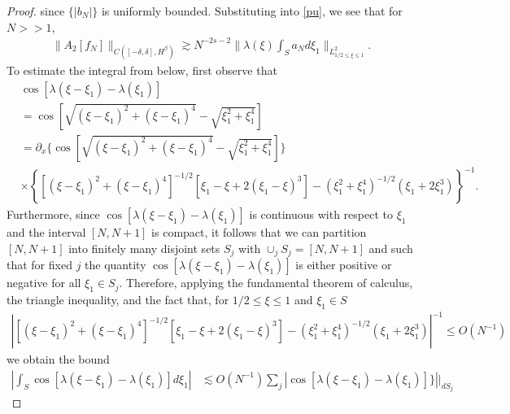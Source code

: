 \documentclass[12pt,reqno]{amsart}
\numberwithin{equation}{section}  %
\newcommand{\p}{\partial}
\begin{document}
\begin{proof}
%
since $\{|b_{N}|\}$ is uniformly bounded. Substituting into \eqref{pu}, we see that for $N > > 1$,  
%
%
\begin{equation*}
\begin{split}
\|A_{2}[f_{N}]\|_{C( [-\delta, \delta], H^{\beta})}
\gtrsim N^{-2 s -2} \|  \lambda(\xi) \int_{S}a_{N} d \xi_{1} \|_{L^{2}_{1/2 \le \xi \le 1}}.
\end{split}
\end{equation*}
%
%
To estimate the integral from below, first observe that 
\begin{equation*}
\begin{split}
  & \cos[\lambda(\xi - \xi_{1}) - \lambda(\xi_{1})] 
  \\
  & = \cos\left[ \sqrt{(\xi - \xi_{1})^{2} + (\xi - \xi_{1})^{4}} - \sqrt{\xi_{1}^{2} + \xi_{1}^{4}} \right] 
  \\
  & = \p_{x} \{ \cos\left[ \sqrt{(\xi - \xi_{1})^{2} + (\xi - \xi_{1})^{4}} - \sqrt{\xi_{1}^{2} + \xi_{1}^{4}} \right] \} 
  \\
  & \times \left\{ [(\xi - \xi_{1})^{2} + (\xi - \xi_{1})^{4}]^{-1/2}[\xi_{1} - \xi + 2(\xi_{1} - \xi)^{3}] - (\xi_{1}^{2} + \xi_{1}^{4})^{-1/2} (\xi_{1} + 2 \xi_{1}^{3}) \right\}^{-1}.
\end{split}
\end{equation*}
%
%
Furthermore, since $\cos[\lambda(\xi - \xi_{1}) - \lambda(\xi_{1})]$ is continuous with respect to $\xi_{1}$ and the interval $[N, N+1]$ is compact, it follows that we can partition $[N, N+1]$ into finitely many disjoint sets $S_{j}$ with $\cup_{j} S_{j} = [N, N+1]$ and such that for fixed $j$ the quantity $\cos[\lambda(\xi - \xi_{1}) - \lambda(\xi_{1})]$ is either positive or negative for all $\xi_{1} \in S_{j}$. Therefore, applying the fundamental theorem of calculus, the triangle inequality, and the fact that, for $1/2 \le \xi \le 1$ and $\xi_{1} \in S$
%
%
\begin{equation*}
\begin{split}
  \left | [(\xi - \xi_{1})^{2} + (\xi - \xi_{1})^{4}]^{-1/2}[\xi_{1} - \xi + 2(\xi_{1} - \xi)^{3}] - (\xi_{1}^{2} + \xi_{1}^{4})^{-1/2} (\xi_{1} + 2 \xi_{1}^{3}) \right | ^{-1} \le O(N^{-1}) 
\end{split}
\end{equation*}
%
%
we obtain the bound
%
%
\begin{equation*}
\begin{split}
  | \int_{S} \cos[\lambda(\xi - \xi_{1}) - \lambda(\xi_{1})] d \xi_{1} |
   & \lesssim O(N^{-1}) \sum_{j} \left | \cos[\lambda(\xi - \xi_{1}) - \lambda(\xi_{1}) ] \} \right | \bigg |_{dS_{j}}

\end{split}
\end{equation*}
\end{proof}
\end{document}
